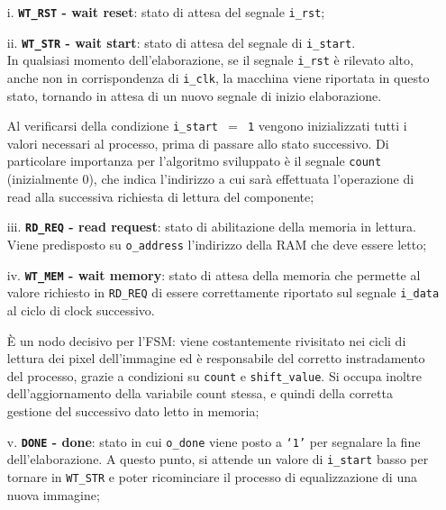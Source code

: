 \documentclass{article}
\begin{document}
\begin{itemize}
    \item [i.]      \textbf{\texttt{WT\_RST} - wait reset}: stato di attesa del segnale \texttt{i\_rst};
    \item [ii.]     \textbf{\texttt{WT\_STR} - wait start}: stato di attesa del segnale di \texttt{i\_start}. \\
                    In qualsiasi momento dell’elaborazione, se il segnale \texttt{i\_rst} è rilevato alto\footnotemark, anche non in corrispondenza di \texttt{i\_clk}, la macchina viene riportata in questo stato, tornando in attesa di un nuovo segnale di inizio elaborazione.\par
                    Al verificarsi della condizione \texttt{i\_start $=$ 1} vengono inizializzati tutti i valori necessari al processo, prima di passare allo stato successivo. Di particolare importanza per l’algoritmo sviluppato è il segnale \texttt{count} (inizialmente 0), che indica l’indirizzo a cui sarà effettuata l’operazione di read alla successiva richiesta di lettura del componente;
    \item [iii.]    \textbf{\texttt{RD\_REQ} - read request}: stato di abilitazione della memoria in lettura. Viene predisposto su \texttt{o\_address} l’indirizzo della RAM che deve essere letto;
    \item [iv.]     \textbf{\texttt{WT\_MEM} - wait memory}: stato di attesa della memoria che permette al valore richiesto in \texttt{RD\_REQ} di essere correttamente riportato sul segnale \texttt{i\_data} al ciclo di clock successivo. \par
                    È un nodo decisivo per l’FSM: viene costantemente rivisitato nei cicli di lettura dei pixel dell’immagine ed è responsabile del corretto instradamento del processo, grazie a condizioni su \texttt{count} e \texttt{shift\_value}. Si occupa inoltre dell’aggiornamento della variabile count stessa, e quindi della corretta gestione del successivo dato letto in memoria;
    \item [v.]      \textbf{\texttt{DONE} - done}: stato in cui \texttt{o\_done} viene posto a \texttt{‘1’} per segnalare la fine dell’elaborazione. A questo punto, si attende un valore di \texttt{i\_start} basso per tornare in \texttt{WT\_STR} e poter ricominciare il processo di equalizzazione di una nuova immagine;
\end{itemize}
\end{document}

